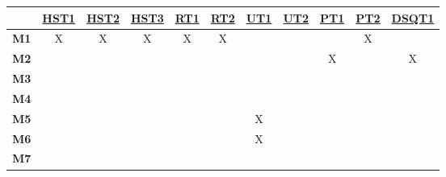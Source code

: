 \documentclass[12pt, titlepage]{article}
\begin{document}
\begin{table}[H]
  \centering
  \begin{tabular}{|c|c|c|c|c|c|c|c|c|c|c|}
    \hline
                 & \hyperref[HST1]{HST1} & \hyperref[HST2]{HST2} & \hyperref[HST3]{HST3}& \hyperref[RT1]{RT1} & \hyperref[RT2]{RT2} & \hyperref[UT1]{UT1} & \hyperref[UT2]{UT2}  & \hyperref[PT1]{PT1} & \hyperref[PT2]{PT2} & \hyperref[DSQT1]{DSQT1} \\
    \hline
    \textbf{M1}  & X                     & X                     & X                     & X                   & X                   &                     &                                         &                     & X                   &                         \\ \hline
    \textbf{M2}  &                       &                       &                       &                     &                     &                     &                                          & X                   &                     & X                       \\ \hline
    \textbf{M3}  &                       &                       &                       &                     &                     &                     &                                         &                     &                     &                         \\ \hline
    \textbf{M4}  &                       &                       &                       &                     &                     &                     &                                          &                     &                     &                         \\ \hline
    \textbf{M5}  &                       &                       &                     &                     &                     & X                   &                                          &                     &                     &                         \\ \hline
    \textbf{M6}  &                       &                       &                       &                     &                     & X                   &                                          &                     &                     &                         \\ \hline
    \textbf{M7}  &                       &                       &                     &                     &                     &                     &                     &                     &                     &                         \\ \hline

\end{tabular}
\end{table}
\end{document}

